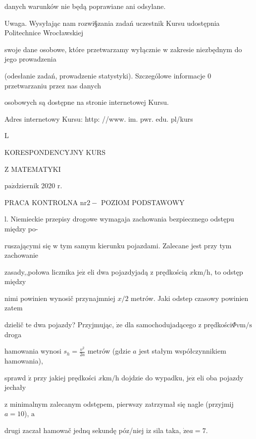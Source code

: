 \documentclass[a4paper,12pt]{article}
\begin{document}
danych warunków nie będą poprawiane ani odsylane.

Uwaga. Wysyłając nam rozwi\S zania zadań uczestnik Kursu udostępnia Politechnice Wrocławskiej

swoje dane osobowe, które przetwarzamy wyłącznie $\mathrm{w}$ zakresie niezbędnym do jego prowadzenia

(odesłanie zadań, prowadzenie statystyki). Szczególowe informacje $0$ przetwarzaniu przez nas danych

osobowych są dostępne na stronie internetowej Kursu.

Adres internetowy Kursu: http: //www. im. pwr. edu. pl/kurs







L

KORESPONDENCYJNY KURS

Z MATEMATYKI

$\mathrm{p}\mathrm{a}\acute{\mathrm{z}}$dziernik 2020 $\mathrm{r}.$

PRACA KONTROLNA $\mathrm{n}\mathrm{r} 2-$ POZIOM PODSTAWOWY

l. Niemieckie przepisy drogowe wymagaja zachowania bezpiecznego odstępu między po-

ruszającymi się $\mathrm{w}$ tym samym kierunku pojazdami. Zalecane jest przy tym zachowanie

zasady,,połowa licznika $\mathrm{j}\mathrm{e}\dot{\mathrm{z}}$ eli dwa pojazdyjadą $\mathrm{z}$ prędkością $x\mathrm{k}\mathrm{m}/\mathrm{h}$, to odstęp między

nimi powinien wynosič przynajmniej $x/2$ metrów. Jaki odstep czasowy powinien zatem

dzielič te dwa pojazdy? Przyjmując, $\dot{\mathrm{z}}\mathrm{e}$ dla samochodujadącego $\mathrm{z}$ prędkości$\Phi v\mathrm{m}/\mathrm{s}$ droga

hamowania wynosi $s_{h}=\displaystyle \frac{v^{2}}{2a}$ metrów (gdzie $a$ jest stałym współczynnikiem hamowania),

sprawd $\acute{\mathrm{z}}$ przy jakiej prędkości $x\mathrm{k}\mathrm{m}/\mathrm{h}$ dojdzie do wypadku, $\mathrm{j}\mathrm{e}\dot{\mathrm{z}}$ eli oba pojazdy jechały

$\mathrm{z}$ minimalnym zalecanym odstępem, pierwszy zatrzymał się nagle (przyjmij $a=10$), $\mathrm{a}$

drugi zaczał hamowač jednq sekundę póz/niej $\mathrm{i}\mathrm{z}$ sila taka, $\dot{\mathrm{z}}\mathrm{e}a=7.$
\end{document}
